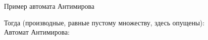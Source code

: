 \begin{frame}{Пример автомата Антимирова}
    \vspace{-5pt}

    Тогда (производные, равные пустому множеству, здесь опущены):\\
    Автомат Антимирова:

\end{frame}